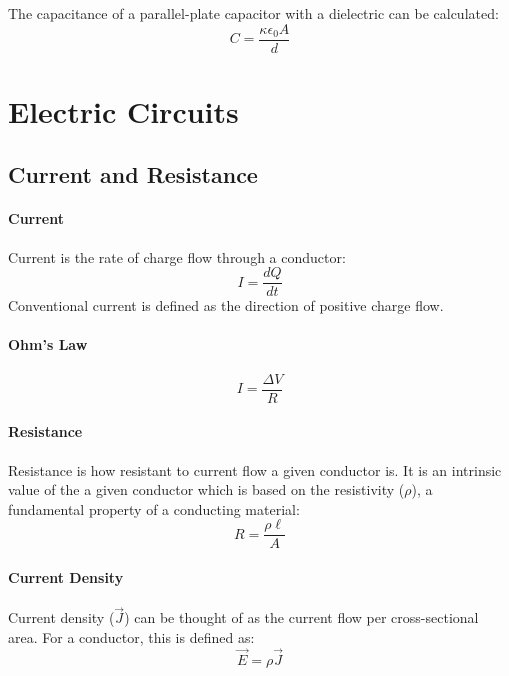 \documentclass{article}
\begin{document}
            The capacitance of a parallel-plate capacitor with a dielectric can be calculated:
            \begin{equation}
                C = \frac{\kappa \epsilon_0 A}{d}
            \end{equation}

    \section{Electric Circuits}

        \subsection{Current and Resistance}
            \paragraph{Current}
            Current is the rate of charge flow through a conductor:
            \begin{equation}
                I = \frac{dQ}{dt}
            \end{equation}
            Conventional current is defined as the direction of positive charge flow.

            \paragraph{Ohm's Law}
            \begin{equation}
                I = \frac{\Delta V}{R}
            \end{equation}

            \paragraph{Resistance}
            Resistance is how resistant to current flow a given conductor is. It is an intrinsic value of the a given conductor which is based on the resistivity ($\rho$), a fundamental property of a conducting material:
            \begin{equation}
                R = \frac{\rho \ell}{A}
            \end{equation}

            \paragraph{Current Density}
            Current density ($\vec{J}$) can be thought of as the current flow per cross-sectional area. For a conductor, this is defined as:
            \begin{equation}
                \vec{E} = \rho \vec{J}
            \end{equation}
\end{document}
